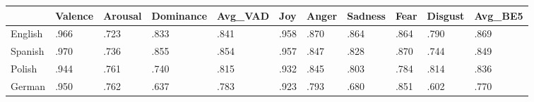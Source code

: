 \begin{tabular}{lllllllllll}
\toprule
{} & Valence & Arousal & Dominance & Avg\_VAD &  Joy & Anger & Sadness & Fear & Disgust & Avg\_BE5 \\
\midrule
English &    .966 &    .723 &      .833 &    .841 & .958 &  .870 &    .864 & .864 &    .790 &    .869 \\
Spanish &    .970 &    .736 &      .855 &    .854 & .957 &  .847 &    .828 & .870 &    .744 &    .849 \\
Polish  &    .944 &    .761 &      .740 &    .815 & .932 &  .845 &    .803 & .784 &    .814 &    .836 \\
German  &    .950 &    .762 &      .637 &    .783 & .923 &  .793 &    .680 & .851 &    .602 &    .770 \\
\bottomrule
\end{tabular}

